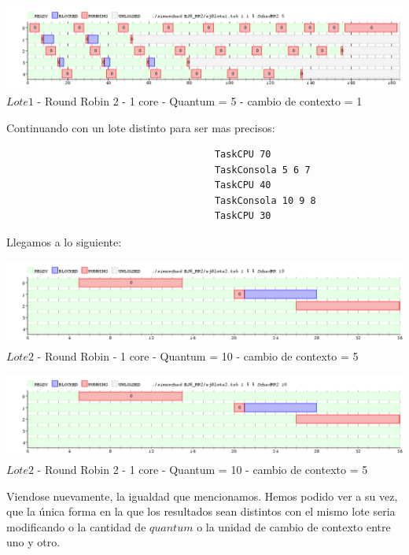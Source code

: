  \begin{center}
    	\includegraphics[width=450pt]{./EJ8_RR2/dif1corerr2.png}
	{$Lote 1$ - Round Robin 2 - 1 core - Quantum = 5 - cambio de contexto = 1}	
 \end{center}

Continuando con un lote distinto para ser mas precisos:

 \begin{verbatim}
                                     TaskCPU 70
                                     TaskConsola 5 6 7
                                     TaskCPU 40
                                     TaskConsola 10 9 8
                                     TaskCPU 30
 \end{verbatim}
 
Llegamos a lo siguiente:\\

 \begin{center}
    	\includegraphics[width=450pt]{./EJ8_RR2/dif2corerr.png}
	{$Lote 2$ - Round Robin - 1 core - Quantum = 10 - cambio de contexto = 5}	
 \end{center}
 
 \begin{center}
    	\includegraphics[width=450pt]{./EJ8_RR2/dif2corerr2.png}
	{$Lote 2$ - Round Robin 2 - 1 core - Quantum = 10 - cambio de contexto = 5}	
 \end{center}
 
 Viendose nuevamente, la igualdad que mencionamos. Hemos podido ver a su vez, que la única
 forma en la que los resultados sean distintos con el mismo lote seria modificando o la
 cantidad de $quantum$ o la unidad de cambio de contexto entre uno y otro.\\
 

